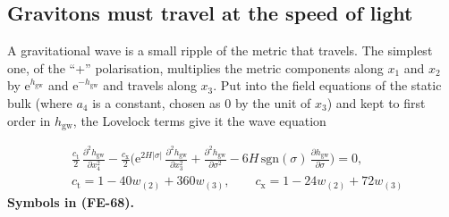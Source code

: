 \documentclass[
  10pt,
]{article}
\begin{document}
\hypertarget{gravitons-must-travel-at-the-speed-of-light}{%
\subsection{Gravitons must travel at the speed of
light}\label{gravitons-must-travel-at-the-speed-of-light}}

A gravitational wave is a small ripple of the metric that travels. The
simplest one, of the ``+'' polarisation, multiplies the metric
components along \(x_1\) and \(x_2\) by \(\mathrm{e}^{h_{\mathrm{gw}}}\)
and \(\mathrm{e}^{-h_{\mathrm{gw}}}\) and travels along \(x_3\). Put
into the field equations of the static bulk (where \(a_4\) is a
constant, chosen as 0 by the unit of \(x_3\)) and kept to first order in
\(h_{\mathrm{gw}}\), the Lovelock terms give it the wave equation

\[
\begin{aligned}
&\frac{c_{\mathrm{t}}}{2}\,\frac{\partial^2h_{\mathrm{gw}}}{\partial x_4^2}
 - \frac{c_{\mathrm{x}}}{2}\Big(\mathrm{e}^{2H\lvert\sigma\rvert}\,\frac{\partial^2h_{\mathrm{gw}}}{\partial x_3^2}
 + \frac{\partial^2h_{\mathrm{gw}}}{\partial\sigma^2} - 6H\,\mathrm{sgn}(\sigma)\,\frac{\partial h_{\mathrm{gw}}}{\partial\sigma}\Big) = 0,\\
&c_{\mathrm{t}} = 1 - 40w_{(2)} + 360w_{(3)},\qquad c_{\mathrm{x}} = 1 - 24w_{(2)} + 72w_{(3)}
\end{aligned} \tag{FE-68}
\] \textbf{Symbols in (FE-68).}
\end{document}
